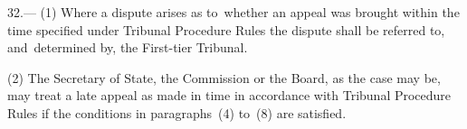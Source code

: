 \documentclass[12pt,a4paper]{article}
\begin{document}
32.—%
%
%
%
(1) Where a dispute arises as to~whether an appeal was brought within the time specified under Tribunal Procedure Rules the dispute shall be referred to, and~determined by, the First-tier Tribunal.

(2) The Secretary of State, the Commission or the Board, as the case may be, may treat a late appeal as made in time in accordance with Tribunal Procedure Rules if the conditions in paragraphs~(4) to~(8) are satisfied.

%

%
\end{document}
